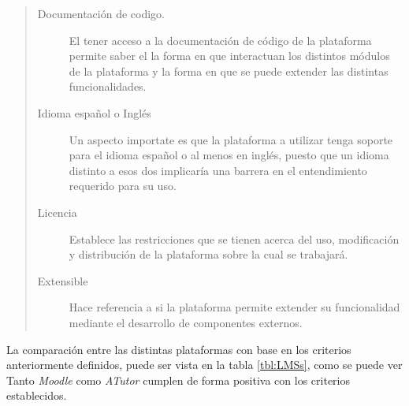    \begin{quote}
    \begin{description}
    \item[Documentación de codigo.] El tener acceso a la documentación de código de
            la plataforma permite saber el la forma en que interactuan los distintos
            módulos de la plataforma y la forma en que se puede extender las distintas
            funcionalidades.

    \item[Idioma español o Inglés] Un aspecto importate es que la plataforma a utilizar
            tenga soporte para el idioma español o al menos en inglés, puesto que un
            idioma distinto a esos dos implicaría una barrera en el entendimiento requerido
            para su uso.

    \item[Licencia] Establece las restricciones que se tienen acerca del uso, modificación
            y distribución de la plataforma sobre la cual se trabajará.

    \item[Extensible] Hace referencia a si la plataforma permite extender su funcionalidad
            mediante el desarrollo de componentes externos.
    \end{description}
    \end{quote}
    
 \noindent La comparación entre las distintas plataformas con base en los criterios
 anteriormente definidos, puede ser vista en la tabla \ref{tbl:LMSs}, como se puede
 ver Tanto {\it Moodle} como {\it ATutor} cumplen de forma positiva con los criterios
 establecidos.

 \clearpage
 


